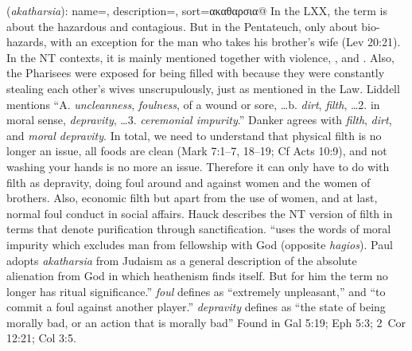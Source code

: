 \item[Depravity,]

(\textit{akatharsia}):
{
    name=,
    description={},
    sort=ακαθαρσια@
}
In the LXX, the term is about the hazardous and contagious. But in the Pentateuch, only about bio-hazards, with an exception for the man who takes his brother's wife (Lev 20:21). In the NT contexts, it is mainly mentioned together with  violence, , and . Also, the Pharisees were exposed for being filled with  because they were constantly stealing each other's wives unscrupulously, just as mentioned in the Law. Liddell mentions ``A. \emph{uncleanness}, \emph{foulness}, of a wound or sore, \ldots b. \emph{dirt}, \emph{filth}, \ldots 2. in moral sense, \emph{depravity}, \ldots 3. \emph{ceremonial impurity}.'' Danker agrees with \emph{filth}, \emph{dirt}, and \emph{moral depravity}. In total, we need to understand that physical filth is no longer an issue, all foods are clean (Mark 7:1--7, 18--19; Cf Acts 10:9), and not washing your hands is no more an issue. Therefore it can only have to do with filth as depravity, doing foul around and against women and the women of brothers. Also, economic filth but apart from the use of women, and at last, normal foul conduct in social affairs. Hauck describes the NT version of filth in terms that denote purification through sanctification. ``uses the words of moral impurity which excludes man from fellowship with God (opposite \emph{hagios}). Paul adopts \emph{akatharsia} from Judaism as a general description of the absolute alienation from God in which heathenism finds itself. But for him the term no longer has ritual significance.'' \emph{foul} defines as ``extremely unpleasant,'' and ``to commit a foul against another player.'' \emph{depravity} defines as ``the state of being morally bad, or an action that is morally bad''
Found in Gal 5:19; Eph 5:3; 2~Cor 12:21; Col 3:5.
